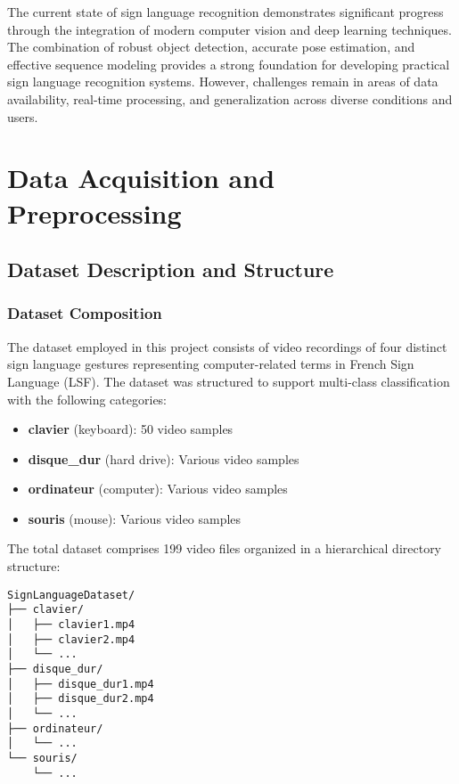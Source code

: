 \documentclass[11pt, a4paper]{article}
\begin{document}
The current state of sign language recognition demonstrates significant progress through the integration of modern computer vision and deep learning techniques. The combination of robust object detection, accurate pose estimation, and effective sequence modeling provides a strong foundation for developing practical sign language recognition systems. However, challenges remain in areas of data availability, real-time processing, and generalization across diverse conditions and users.

\section{Data Acquisition and Preprocessing}

\subsection{Dataset Description and Structure}

\subsubsection{Dataset Composition}

The dataset employed in this project consists of video recordings of four distinct sign language gestures representing computer-related terms in French Sign Language (LSF). The dataset was structured to support multi-class classification with the following categories:

\begin{itemize}
    \item \textbf{clavier} (keyboard): 50 video samples
    \item \textbf{disque\_dur} (hard drive): Various video samples
    \item \textbf{ordinateur} (computer): Various video samples  
    \item \textbf{souris} (mouse): Various video samples
\end{itemize}

The total dataset comprises 199 video files organized in a hierarchical directory structure:

\begin{verbatim}
SignLanguageDataset/
├── clavier/
│   ├── clavier1.mp4
│   ├── clavier2.mp4
│   └── ...
├── disque_dur/
│   ├── disque_dur1.mp4
│   ├── disque_dur2.mp4
│   └── ...
├── ordinateur/
│   └── ...
└── souris/
    └── ...
\end{verbatim}
\end{document}
